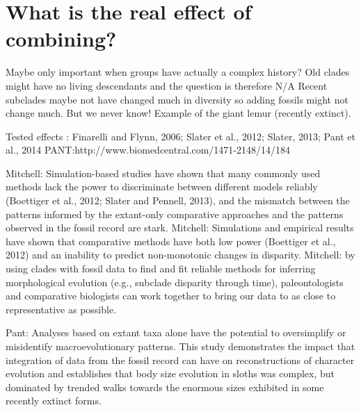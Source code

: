 \section{What is the real effect of combining?}
Maybe only important when groups have actually a complex history?
Old clades might have no living descendants and the question is therefore N/A
Recent subclades maybe not have changed much in diversity so adding fossils might not change much.
But we never know! Example of the giant lemur (recently extinct).

Tested effects : Finarelli and Flynn, 2006; Slater et al., 2012; Slater, 2013; Pant et al., 2014   PANT:http://www.biomedcentral.com/1471-2148/14/184


Mitchell: Simulation-based studies have shown that many commonly used methods lack the power to discriminate between different models reliably (Boettiger et al., 2012; Slater and Pennell, 2013), and the mismatch between the patterns informed by the extant-only comparative approaches and the patterns observed in the fossil record are stark.
Mitchell: Simulations and empirical results have shown that comparative methods have both low power (Boettiger et al., 2012) and an inability to predict non-monotonic changes in disparity.
Mitchell: by using clades with fossil data to find and fit reliable methods for inferring morphological evolution (e.g., subclade disparity through time), paleontologists and comparative biologists can work together to bring our data to as close to representative as possible.

Pant: Analyses based on extant taxa alone have the potential to oversimplify or misidentify macroevolutionary patterns. This study demonstrates the impact that integration of data from the fossil record can have on reconstructions of character evolution and establishes that body size evolution in sloths was complex, but dominated by trended walks towards the enormous sizes exhibited in some recently extinct forms.